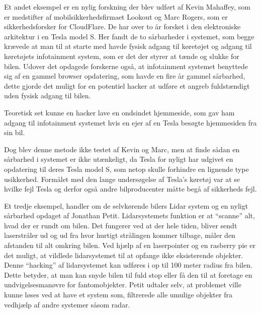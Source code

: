 Et andet eksempel er en nylig forskning der blev udført af Kevin Mahaffey, som er medstifter af mobilsikkerhedsfirmaet Lookout og Marc Rogers, som er sikkerhedsforsker for CloudFlare. De har over to år forsket i den elektroniske arkitektur i en Tesla model S. Her fandt de to sårbarheder i systemet, som begge krævede at man til at starte med havde fysisk adgang til køretøjet og adgang til køretøjets infotainment system, som er det der styrer at tænde og slukke for bilen. Udover det opdagede forskerne også, at infotainment systemet benyttede sig af en gammel browser opdatering, som havde en fire år gammel sårbarhed, dette gjorde det muligt for en potentiel hacker at udføre et angreb fuldstændigt uden fysisk adgang til bilen.

Teoretisk set kunne en hacker lave en ondsindet hjemmeside, som gav ham adgang til infotainment systemet hvis en ejer af en Tesla besøgte hjemmesiden fra sin bil.

Dog blev denne metode ikke testet af Kevin og Marc, men at finde sådan en sårbarhed i systemet er ikke utænkeligt, da Tesla for nyligt har udgivet en opdatering til deres Tesla model S, som netop skulle forhindre en lignende type usikkerhed.  Formålet med den lange undersøgelse af Tesla's køretøj var at se hvilke fejl Tesla og derfor også andre bilproducenter måtte begå af sikkerheds fejl. \cite{Tesla}


Et tredje eksempel, handler om de selvkørende bilers Lidar system og en nyligt sårbarhed opdaget af Jonathan Petit. Lidarsystemets funktion er at ``scanne'' alt, hvad der er rundt om bilen. Det fungerer ved at der hele tiden, bliver sendt laserstråler ud og ud fra hvor hurtigt strålingen kommer tilbage, måler den afstanden til alt omkring bilen. Ved hjælp af en laserpointer og en rasberry pie er det muligt, at vildlede lidarsystemet til at opfange ikke eksisterende objekter. Denne ``hacking'' af lidarsystemet kan udføres i op til 100 meter radius fra bilen. Dette betyder, at man kan snyde bilen til fuld stop eller få den til at foretage en  undvigelsesmanøvre for fantomobjekter. Petit udtaler selv, at problemet ville kunne løses ved at have et system som, filtrerede alle umulige objekter fra vedhjælp af andre systemer såsom radar. \cite{Lidar}
